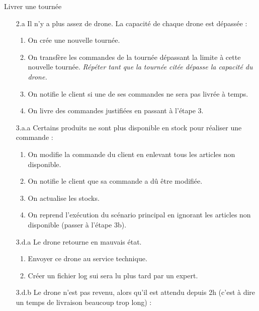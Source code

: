 \begin{UseCase}{Livrer une tournée}
\begin{UseCaseExtension}
    \begin{enumerate}
        \item[2.a] Il n'y a plus assez de drone. La capacité de chaque drone
            est dépassée :
            \begin{enumerate}
                \item On crée une nouvelle tournée.
                \item On transfère les commandes de la tournée dépassant la
                    limite à cette nouvelle tournée. \textit{Répéter tant que
                        la tournée citée dépasse la capacité du drone.}
                \item On notifie le client si une de ses commandes ne sera pas
                    livrée à temps.
                \item On livre des commandes justifiées en passant à l'étape 3.
            \end{enumerate}
        \item[3.a.a] Certains produits ne sont plus disponible en stock pour
            réaliser une commande :
            \begin{enumerate}
                \item On modifie la commande du client en enlevant tous les
                    articles non disponible.
                \item On notifie le client que sa commande a dû être modifiée.
                \item On actualise les stocks.
                \item On reprend l'exécution du scénario principal en ignorant
                    les articles non disponible (passer à l'étape 3b).
            \end{enumerate}
        \item[3.d.a] Le drone retourne en mauvais état.
            \begin{enumerate}
                \item Envoyer ce drone au service technique.
                \item Créer un fichier log sui sera lu plus tard par un expert.
            \end{enumerate}
        \item[3.d.b] Le drone n'est pas revenu, alors qu'il est attendu depuis
            2h (c'est à dire un temps de livraison beaucoup trop long) :
            \begin{enumerate}

\end{enumerate}
\end{enumerate}
\end{UseCaseExtension}
\end{UseCase}
